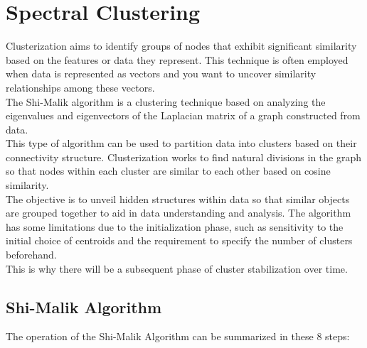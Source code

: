 \section{Spectral Clustering}
Clusterization aims to identify groups of nodes that exhibit significant similarity based on the features or data they represent.
This technique is often employed when data is represented as vectors and you want to uncover similarity relationships among these vectors.\\
The Shi-Malik algorithm is a clustering technique based on analyzing the eigenvalues and eigenvectors of the Laplacian matrix of a graph constructed from data.\\
This type of algorithm can be used to partition data into clusters based on their connectivity structure.
Clusterization works to find natural divisions in the graph so that nodes within each cluster are similar to each other based on cosine similarity. \\
The objective is to unveil hidden structures within data so that similar objects are grouped together to aid in data understanding and analysis.
The algorithm has some limitations due to the initialization phase, such as sensitivity to the initial choice of centroids and the requirement to specify the number of clusters beforehand.\\
This is why there will be a subsequent phase of cluster stabilization over time.

\subsection{Shi-Malik Algorithm}
The operation of the Shi-Malik Algorithm can be summarized in these 8 steps:

